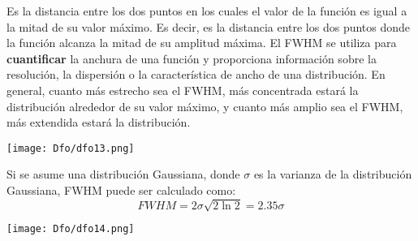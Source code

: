 \documentclass[
	12pt, %
	fleqn, %
	a4paper, %
	oneside, %
]{LegrandOrangeBook}
\begin{document}
\begin{definition}
Es la distancia entre los dos puntos en los cuales el valor de la función es igual a la mitad de su valor máximo. Es decir, es la distancia entre los dos puntos donde la función alcanza la mitad de su amplitud máxima. El FWHM se utiliza para \textbf{cuantificar} la anchura de una función y proporciona información sobre la resolución, la dispersión o la característica de ancho de una distribución. En general, cuanto más estrecho sea el FWHM, más concentrada estará la distribución alrededor de su valor máximo, y cuanto más amplio sea el FWHM, más extendida estará la distribución.
\begin{center}
\texttt{[image: Dfo/dfo13.png]}
\end{center}
Si se asume una distribución Gaussiana, donde $\sigma$ es la varianza de la distribución Gaussiana, FWHM puede ser calculado como:
\begin{equation}
FWHM=2\sigma\sqrt{2\ln 2}=2.35\sigma
\end{equation}
\begin{center}
\texttt{[image: Dfo/dfo14.png]}
\end{center}
\end{definition}
\end{document}
